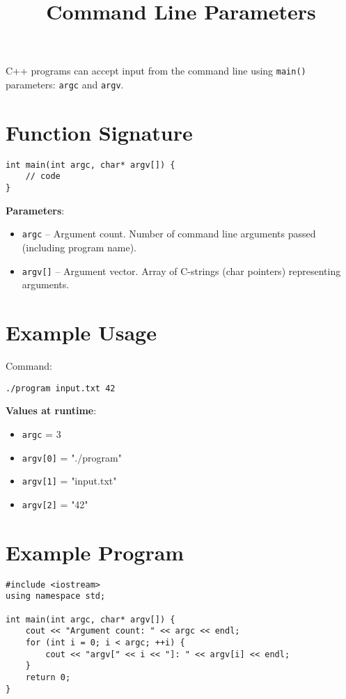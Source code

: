 \documentclass{article}
\title{Command Line Parameters}
\author{}
\date{}
\begin{document}
\maketitle

C++ programs can accept input from the command line using \texttt{main()} parameters: \texttt{argc} and \texttt{argv}.

\section{Function Signature}

\begin{lstlisting}[style=cppstyle]
int main(int argc, char* argv[]) {
    // code
}
\end{lstlisting}

\textbf{Parameters}:
\begin{itemize}
    \item \texttt{argc} – Argument count. Number of command line arguments passed (including program name).
    \item \texttt{argv[]} – Argument vector. Array of C-strings (char pointers) representing arguments.
\end{itemize}

\section{Example Usage}

Command:
\begin{lstlisting}[style=cppstyle]
./program input.txt 42
\end{lstlisting}

\textbf{Values at runtime}:
\begin{itemize}
    \item \texttt{argc} = 3
    \item \texttt{argv[0]} = "./program"
    \item \texttt{argv[1]} = "input.txt"
    \item \texttt{argv[2]} = "42"
\end{itemize}

\section{Example Program}

\begin{lstlisting}[style=cppstyle]
#include <iostream>
using namespace std;

int main(int argc, char* argv[]) {
    cout << "Argument count: " << argc << endl;
    for (int i = 0; i < argc; ++i) {
        cout << "argv[" << i << "]: " << argv[i] << endl;
    }
    return 0;
}
\end{lstlisting}
\end{document}
